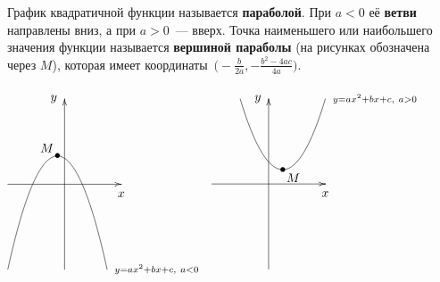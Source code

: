  График квадратичной функции называется \textbf{параболой}.
При $a < 0$ её \textbf{ветви} направлены вниз, а при $a > 0$~--- вверх.
Точка наименьшего или наибольшего значения функции называется \textbf{вершиной параболы} (на рисунках обозначена через $M$), которая имеет координаты~$\bigl( -\frac{b}{2a}, -\frac{b^2 - 4ac}{4a} \bigr)$.
\begin{center}
$\begin{xy} /r8mm/:
(-2, 0); (2, 0) **@{-} *@{>} *++!U{x};
(0, -3); (0, 3) **@{-} *@{>} *++!R{y};
(-2, -3); (1.5, -3) **\crv{(-0.25, 5)} *++!L{\scriptstyle y = ax^2 + bx + c, \ a < 0};
(-0.25, 1) *{\bullet} *+!DR{M};
\end{xy}$
$\begin{xy} /r8mm/:
(-2, 0); (2, 0) **@{-} *@{>} *++!U{x};
(0, -3); (0, 3) **@{-} *@{>} *++!R{y};
(-1, 3); (2, 3) **\crv{(0.5, -2)} *++!L{\scriptstyle y = ax^2 + bx + c, \ a > 0};
(0.5, 0.5) *{\bullet} *+!UL{M};
\end{xy}$
\end{center}